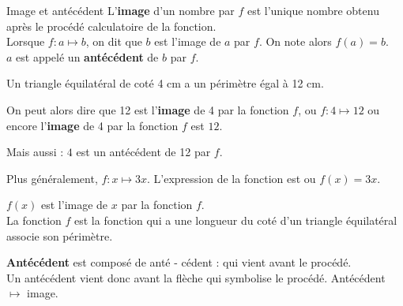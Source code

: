 \begin{pageCours}
\begin{DefT}{Image et antécédent}
L'\textbf{image}  d'un nombre par $f$ est l'unique nombre obtenu après le procédé calculatoire de la fonction.\\ Lorsque $f : a \longmapsto b$, on dit que $b$ est l'image de $a$ par $f$. On note alors $f(a)=b$. \\
$a$ est appelé un  \textbf{antécédent} de $b$ par $f$.
\end{DefT}

\begin{Ex}
Un triangle équilatéral de coté 4 cm a un périmètre égal à 12 cm.

On peut alors dire que 12 est l'\textbf{image} de 4 par la fonction $f$, ou $f : 4 \mapsto 12$ ou encore l'\textbf{image} de 4 par la fonction $f$ est $12$. 

Mais aussi : $4$ est un antécédent de 12 par $f$.

Plus généralement, $f : x \mapsto 3x$. L'expression de la fonction est ou $f(x)=3x$. 

$f(x)$ est l'image de $x$ par la fonction $f$.\\
La fonction $f$ est la fonction qui a une longueur du coté d'un triangle équilatéral associe son périmètre.
\end{Ex}

\begin{Ety}
\textbf{Antécédent} est composé de anté - cédent : qui vient avant le procédé. \\Un antécédent vient donc avant la flèche qui symbolise  le procédé. Antécédent $\mapsto$  image.
\end{Ety}
 





\end{pageCours} 
